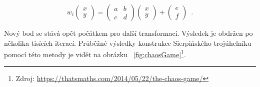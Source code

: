 \documentclass[thesis=B, czech]{FITthesis}[2019/03/06]
\begin{document}
\begin{equation} \label{eq:3}
{\displaystyle 
    w_i\begin{pmatrix}x\\y\end{pmatrix} = 
    \begin{pmatrix}a&b\\c&d\end{pmatrix}\begin{pmatrix}x\\y\end{pmatrix}+\begin{pmatrix}e\\f\end{pmatrix}
    } \enspace .
\end{equation}


Nový bod se stává opět počátkem pro další transformaci. Výsledek je obdržen po několika tisících iterací. Průběžné výsledky konstrukce Sierpińského trojúhelníku pomocí této metody je vidět na obrázku \figurename~\ref{fig:chaosGame}\footnote{Zdroj: \url{https://thatsmaths.com/2014/05/22/the-chaos-game/}}.







\end{document}
